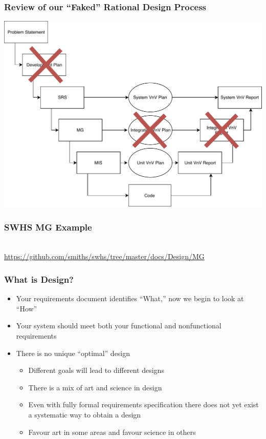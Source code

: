 \documentclass[t,12pt,numbers,fleqn]{beamer}
\begin{document}

\begin{frame}

\frametitle{Review of our ``Faked'' Rational Design Process}

\begin{center}
\includegraphics[scale=0.55]{../Figures/VModelOfProcessXOut.pdf}
\end{center}

\end{frame}


\begin{frame}
\frametitle{SWHS MG Example}
~\\
\href{https://github.com/smiths/swhs/tree/master/docs/Design/MG}
{https://github.com/smiths/swhs/tree/master/docs/Design/MG}
\end{frame}


\begin{frame}
\frametitle{What is Design?}
\begin{itemize}
\item Your requirements document identifies ``What,'' now we begin to look at ``How''
\item Your system should meet both your functional and nonfunctional requirements
\item There is no unique ``optimal'' design
\begin{itemize}
\item Different goals will lead to different designs
\item There is a mix of art and science in design
\item Even with fully formal requirements specification there does not yet exist a systematic way to obtain a design
\item Favour art in some areas and favour science in others
\end{itemize}
\end{itemize}
\end{frame}
\end{document}
